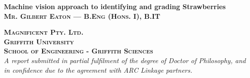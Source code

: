 \documentclass[fleqn,twoside,12pt]{report}
\begin{document}
\raggedbottom

\begin{titlepage}


\newcommand{\HRule}{\rule{\linewidth}{0.5mm}} %
 
\begin{flushleft} 
 



{ \Huge \bfseries Machine vision approach to identifying and grading Strawberries}\\[1.5cm] %


\textsc{\Large \bfseries Mr. Gilbert Eaton --- B.Eng (Hons. I), B.IT}\\[0.5cm] %
 
 
 
\vspace{10mm} 



\textsc{\Large \bfseries Magnificent Pty. Ltd.}\\[0.5cm] %
\textsc{\Large \bfseries Griffith University}\\[0.5cm] %
\textsc{\Large \bfseries School of Engineering - Griffith Sciences}\\[1.5cm] %



\emph{A report submitted in partial fulfilment of the degree of Doctor of Philosophy, and in confidence due to the agreement with ARC Linkage partners.}\\[1.5cm]




\end{flushleft}

\vfill %

\end{titlepage}
\end{document}

